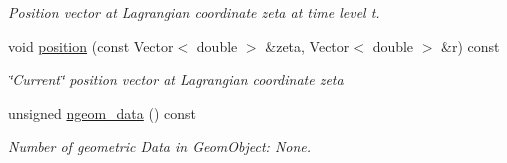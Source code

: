 \begin{DoxyCompactItemize}
\begin{DoxyCompactList}\small\item\em Position vector at Lagrangian coordinate zeta at time level t. \end{DoxyCompactList}\item 
void \hyperlink{classOscillatingWall_a5fce6728f975003d9e85f64c18ba7f55}{position} (const Vector$<$ double $>$ \&zeta, Vector$<$ double $>$ \&r) const
\begin{DoxyCompactList}\small\item\em \char`\"{}\+Current\char`\"{} position vector at Lagrangian coordinate zeta \end{DoxyCompactList}\item 
unsigned \hyperlink{classOscillatingWall_ae3fa3ef50ef7e082b255ba8125373581}{ngeom\+\_\+data} () const
\begin{DoxyCompactList}\small\item\em Number of geometric Data in Geom\+Object\+: None. \end{DoxyCompactList}\end{DoxyCompactItemize}
